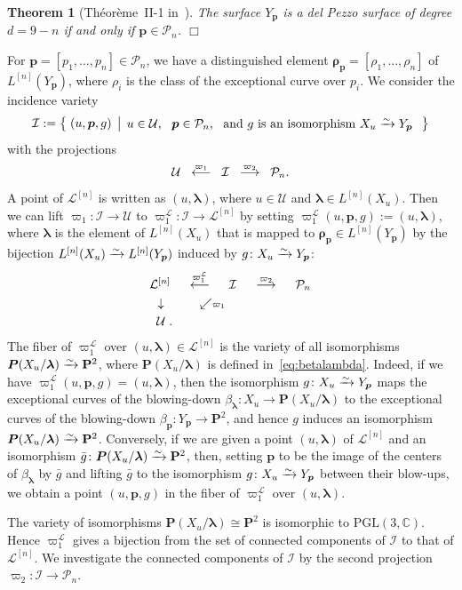 \documentclass{math}
\theoremstyle{plain}
\newtheorem{theorem}{Theorem}[section]
\numberwithin{equation}{section}
\newcommand{\qed}{\hfill {$\Box$}}
\newcommand{\CC}{\mathord{\mathbb C}}
\newcommand{\III}{\mathord{\mathcal I}}
\newcommand{\LLL}{\mathord{\mathcal L}}
\newcommand{\PPP}{\mathord{\mathcal P}}
\newcommand{\UUU}{\mathord{\mathcal U}}
\newcommand{\maprightsp}[1]{\; \smash{\mathop{\; \longrightarrow \; }\limits\sp{#1}}\; }
\newcommand{\mapleftsp}[1]{\; \smash{\mathop{\; \longleftarrow \; }\limits\sp{#1}}\; }
\newcommand{\mapdown}{\phantom{\Big\downarrow}\hskip -8pt \downarrow}
\newcommand{\mapdownleft}[1]{\llap{$\vcenter{\hbox{$\scriptstyle#1$\;}}$}\mapdown}
\newcommand{\isom}{\xrightarrow{\raise -3pt \hbox{\scriptsize $\sim$} }}
\newcommand{\bigset}[2]{\left\{\; {#1} \; \left\vert \; {#2} \;  \right.\right \}}
\newcommand{\PGL}{\mathord{\mathrm{PGL}}}
\newcommand{\mystruth}[1]{\phantom{\hbox{\vrule height #1}}}
\newcommand{\bfP}{\mathbf{P}}
\newcommand{\blambda}{\bm{\lambda}}
\newcommand{\bp}{\bm{p}}
\newcommand{\bP}{\bm{P}}
\newcommand{\brho}{\bm{\rho}}
\begin{document}
%
\begin{theorem}[Th\'eor\`eme~II-1 in~\cite{Demazure1980}]
\label{thm:PPPn}
The surface  $Y_{\bp}$ is a del Pezzo surface of degree $d=9-n$ if and only if $\bp\in \PPP_n$.
\qed
\end{theorem}
%
For $\bp= [p_1, \dots, p_n] \in \PPP_n$, we have a distinguished element 
$\brho_{\bp}=[\rho_1, \dots, \rho_n]$
of $L^{[n]}(Y_{\bp})$, 
where $\rho_i$ is the class of the exceptional curve over $p_i$.
We consider the incidence  variety
%
\[
\III:=\bigset{(u,\bp, g)}{%
\parbox{8.3cm }{\,$u \in \UUU$, \, $\bp\in \PPP_n$, \,
and $g$ is an isomorphism $X_u\isom Y_{\bp}$
}%
}
\]
%
with the projections
\[
\UUU\;\mapleftsp{\varpi_{1}}\;\III\;\maprightsp{\varpi_2}\; \PPP_n.
\]
A point of $\LLL^{[n]}$ is written as $(u, \blambda)$,
where $u\in \UUU$ and $\blambda\in L^{[n]}(X_u)$.
Then we can lift $\varpi_1\colon \III\to \UUU$  to 
$\varpi_1^{\LLL}\colon \III\to \LLL^{[n]}$
by setting
$\varpi_1^{\LLL}(u, \bp, g):=(u, \blambda)$,
where $\blambda$ is the element of 
$L^{[n]}(X_u)$ that is mapped to $\brho_{\bp}\in L^{[n]}(Y_{\bp})$ by 
the bijection $L^{[n]}(X_u) \isom L^{[n]}(Y_{\bp}) $ 
induced by  $g\colon X_u\isom Y_{\bp}$:
\[
\begin{array}{ccccc}
\LLL^{[n]} & \mapleftsp{\varpi_1^{\LLL}} & \III &  \maprightsp{\varpi_2} & \PPP_n\mystruth{15pt} \\
\mapdownleft{} &\rlap{$\swarrow$\scriptsize$\varpi_1$} &&& \\
\,\UUU\rlap{\;.}&&&&
\end{array}
\]
The fiber of $\varpi_1^{\LLL}$ over $(u, \blambda)\in \LLL^{[n]}$ is the variety of all isomorphisms
$\bP(X_u/\blambda)\isom{\bfP}^{2}$,
where $\bP(X_u/\blambda)$ is defined in~\eqref{eq:betalambda}.
Indeed, if we have $\varpi_1^{\LLL}(u,\bp, g)=(u, \blambda)$, then the isomorphism $g\colon X_u\isom Y_{\bp}$ maps  
the exceptional curves of the blowing-down $\beta_{\blambda}\colon X_u\to  \bP(X_u/\blambda)$ to
the exceptional curves of the blowing-down $\beta_{\bp}\colon Y_{\bp}\to {\bfP}^{2}$, 
and hence 
$g$ induces an isomorphism $\bP(X_u/\blambda)\isom{\bfP}^{2}$.
Conversely, if we are given a point $(u, \blambda)$ of $\LLL^{[n]}$ and an isomorphism $\bar{g}\colon \bP(X_u/\blambda)\isom{\bfP}^{2}$,
then, setting $\bp$ to be the image of the centers of 
$\beta_{\blambda}$ by $\bar{g}$ 
and lifting $\bar{g}$
to the isomorphism $g\colon X_u\isom Y_{\bp}$ between  their  blow-ups, 
we obtain  a point $(u,\bp, g)$  in the fiber of $\varpi_1^{\LLL}$ over $(u, \blambda)$.
\par
The variety of isomorphisms %
$\bP(X_u/\blambda)\cong {\bfP}^{2}$
is isomorphic to $\PGL(3, \CC)$.
Hence $\varpi_1^{\LLL}$ gives a bijection from the set of connected components of $\III$
to that of $\LLL^{[n]}$.
We investigate the connected components  of $\III$ by 
the second projection $\varpi_2\colon \III \to \PPP_n$.
%
%
\end{document}
